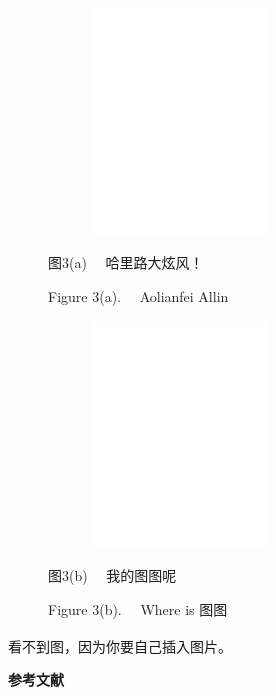 \documentclass[UTF8,a4paper,12pt]{ctexart}
\begin{document}
	\begin{figure}[h]
		\vspace{-0.1cm} 
		\begin{minipage}[t]{0.45\linewidth}
			\centering
			\includegraphics[height=6cm,width=7cm]{pic/fknumscom-eps-converted-to.pdf}
			
			\begin{center}
				\fontsize{10.5pt}{\baselineskip}\heiti 图3(a) \ \  哈里路大炫风！ \par Figure 3(a). \ \ Aolianfei Allin
			\end{center} 
		\end{minipage}
		\begin{minipage}[t]{0.45\linewidth}
			\centering
			\includegraphics[height=6cm,width=7cm]{pic/fknumstime-eps-converted-to.pdf}
			
			\begin{center}
				\fontsize{10.5pt}{\baselineskip}\heiti 图3(b)  \ \  我的图图呢  \par Figure 3(b). \ \ Where is 图图
			\end{center} 
		\end{minipage}
	\end{figure}
	看不到图，因为你要自己插入图片。\textsuperscript{\cite{Ref4}}

	\newpage
	 
	\centerline{\textbf{\fontsize{16pt}{\baselineskip}\heiti 参考文献}}
	\small
	\vspace{-2.5cm} 
	\renewcommand{\refname}{\leftline{　}}
	
	
	
\end{document}
